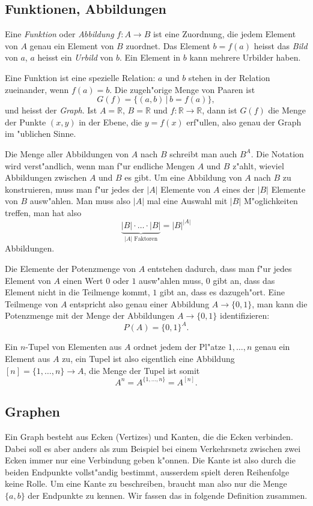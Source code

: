 \subsection{Funktionen, Abbildungen}
Eine {\em Funktion} oder {\em Abbildung} $f\colon A\to B$ ist
eine Zuordnung, die
jedem Element von $A$ genau ein Element von $B$ zuordnet.
Das Element
$b=f(a)$ heisst das {\em Bild} von $a$, $a$ heisst ein {\em Urbild} von $b$. Ein
Element in $b$ kann mehrere Urbilder haben.

Eine Funktion ist eine spezielle Relation: 
$a$  und $b$ stehen in der Relation zueinander, wenn $f(a)=b$. 
Die zugeh"orige Menge von Paaren ist
\[
G(f)=\{(a,b)\,|\,b=f(a)\},
\]
und heisst der {\em Graph}. Ist $A=\mathbb R$, $B=\mathbb R$ und
$f\colon\mathbb R\to\mathbb R$, dann ist $G(f)$ die Menge
der Punkte $(x,y)$ in der Ebene, die $y=f(x)$ erf"ullen, also
genau der Graph im "ublichen Sinne.

Die Menge aller Abbildungen von $A$ nach $B$ schreibt man auch
$B^A$. Die Notation wird verst"andlich, wenn man f"ur endliche
Mengen $A$ und $B$ z"ahlt, wieviel
Abbildungen zwischen $A$ und $B$ es gibt. Um eine Abbildung von
$A$ nach $B$ zu konstruieren, muss man f"ur jedes der $|A|$ Elemente von $A$
eines der $|B|$ Elemente von $B$ ausw"ahlen. Man muss also $|A|$ mal
eine Auswahl mit $|B|$ M"oglichkeiten treffen, man hat also
\[
\underbrace{|B|\cdot\dots\cdot|B|}_{\text{$|A|$ Faktoren}}=|B|^{|A|}
\]
Abbildungen.

Die Elemente der Potenzmenge von $A$ entstehen dadurch, dass man f"ur jedes
Element von $A$ einen Wert $0$ oder $1$ ausw"ahlen muss, $0$ gibt an,
dass das Element nicht in die Teilmenge kommt, $1$ gibt an, dass es dazugeh"ort.
Eine Teilmenge von $A$ entspricht also genau einer Abbildung $A\to\{0,1\}$,
man kann die Potenzmenge mit der Menge der Abbildungen $A\to\{0,1\}$
identifizieren:
\[
P(A) = \{0,1\}^{A}.
\]

Ein $n$-Tupel von Elementen aus $A$ ordnet jedem der Pl"atze
$1,\dots,n$ genau ein Element aus $A$ zu, ein Tupel ist also eigentlich
eine Abbildung $[n]=\{1,\dots,n\}\to A$, die Menge der Tupel ist somit
\[
A^n=A^{\{1,\dots,n\}}=A^{[n]}.
\]

\subsection{Graphen}
Ein Graph besteht aus Ecken (Vertizes) und Kanten,
die die Ecken verbinden.
Dabei
soll es aber anders als zum Beispiel bei einem Verkehrsnetz zwischen zwei
Ecken immer nur eine Verbindung geben k"onnen. Die Kante ist also durch
die beiden Endpunkte vollst"andig bestimmt, ausserdem spielt deren
Reihenfolge keine Rolle. Um eine Kante zu beschreiben, braucht man
also nur die Menge $\{a,b\}$ der Endpunkte zu kennen.
Wir fassen das in folgende Definition zusammen.

